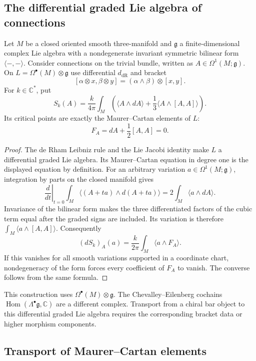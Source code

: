 \subsection{The differential graded Lie algebra of connections}

\begin{theorem}
\label{thm:cs-koszul-km}
Let $M$ be a closed oriented smooth three-manifold and $\mathfrak g$ a finite-dimensional complex Lie algebra with a nondegenerate invariant symmetric bilinear form $\langle-,-\rangle$.
Consider connections on the trivial bundle, written as $A\in\Omega^1(M;\mathfrak g)$.
On $L=\Omega^\bullet(M)\otimes\mathfrak g$ use differential $d_{\mathrm{dR}}$ and bracket
\[
 [\alpha\otimes x,\beta\otimes y]
  =(\alpha\wedge\beta)\otimes[x,y].
\]
For $k\in\mathbb C^*$, put
\[
 S_k(A)=\frac{k}{4\pi}\int_M
 \left(\langle A\wedge dA\rangle
       +\frac13\langle A\wedge[A,A]\rangle\right).
\]
Its critical points are exactly the Maurer--Cartan elements of $L$:
\[
 F_A=dA+\frac12[A,A]=0.
\]
\end{theorem}

\begin{proof}
The de Rham Leibniz rule and the Lie Jacobi identity make $L$ a differential graded Lie algebra.
Its Maurer--Cartan equation in degree one is the displayed equation by definition.
For an arbitrary variation $a\in\Omega^1(M;\mathfrak g)$, integration by parts on the closed manifold gives
\[
 \left.\frac{d}{dt}\right|_{t=0}\int_M\langle(A+ta)\wedge d(A+ta)\rangle
 =2\int_M\langle a\wedge dA\rangle.
\]
Invariance of the bilinear form makes the three differentiated factors of the cubic term equal after the graded signs are included.
Its variation is therefore $\int_M\langle a\wedge[A,A]\rangle$.
Consequently
\[
 (dS_k)_A(a)=\frac{k}{2\pi}\int_M\langle a\wedge F_A\rangle.
\]
If this vanishes for all smooth variations supported in a coordinate chart, nondegeneracy of the form forces every coefficient of $F_A$ to vanish.
The converse follows from the same formula.
\end{proof}

This construction uses $\Omega^\bullet(M)\otimes\mathfrak g$.
The Chevalley--Eilenberg cochains $\operatorname{Hom}(\Lambda^\bullet\mathfrak g,\mathbb C)$ are a different complex.
Transport from a chiral bar object to this differential graded Lie algebra requires the corresponding bracket data or higher morphism components.

\subsection{Transport of Maurer--Cartan elements}

